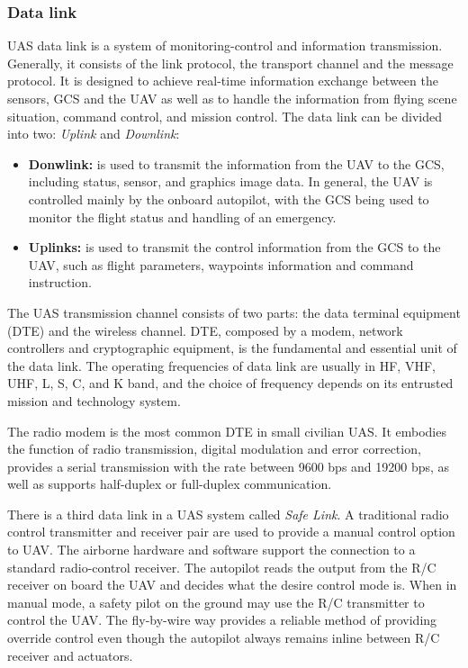 \subsubsection{Data link}
UAS data link is a system of monitoring-control and information transmission. Generally, it consists of the link protocol, the transport channel and the message protocol. It is designed to achieve real-time information exchange between the sensors, GCS and the UAV as well as to handle the information from flying scene situation, command control, and mission control.\cite{6305636} The data link can be divided into two: \textit{Uplink} and \textit{Downlink}:

\begin{itemize}
    \item \textbf{Donwlink:}  is used to transmit the information from the UAV to the GCS, including status, sensor, and graphics image data. In general, the UAV is controlled mainly by the onboard autopilot, with the GCS being used to monitor the flight status and handling of an emergency. \cite{6305636}
    \item \textbf{Uplinks:} is used to transmit the control information from the GCS to the UAV, such as flight parameters, waypoints information and command instruction. \cite{6305636}
\end{itemize}

The UAS transmission channel consists of two parts: the data terminal equipment (DTE) and the wireless channel. DTE, composed by a modem, network controllers and cryptographic equipment, is the fundamental and essential unit of the data link. The operating frequencies of data link are usually in HF, VHF, UHF, L, S, C, and K band, and the choice of frequency depends on its entrusted mission and technology system.\cite{6305636}

The radio modem is the most common DTE in small civilian UAS. It embodies the function of radio transmission, digital modulation and error correction, provides a serial transmission with the rate between 9600 bps and 19200 bps, as well as supports half-duplex or full-duplex communication.\cite{6305636}

There is a third data link in a UAS system called \textit{Safe Link}. A traditional radio control transmitter and receiver pair are used to provide a manual control option to UAV. The airborne hardware and software support the connection to a standard radio-control receiver. The autopilot reads the output from the R/C receiver on board the UAV and decides what the desire control mode is. When in manual mode, a safety pilot on the ground may use the R/C transmitter to control the UAV. The fly-by-wire way provides a reliable method of providing override control even though the autopilot always remains inline between R/C receiver and actuators.\cite{Hattenberger2014UsingTP}

